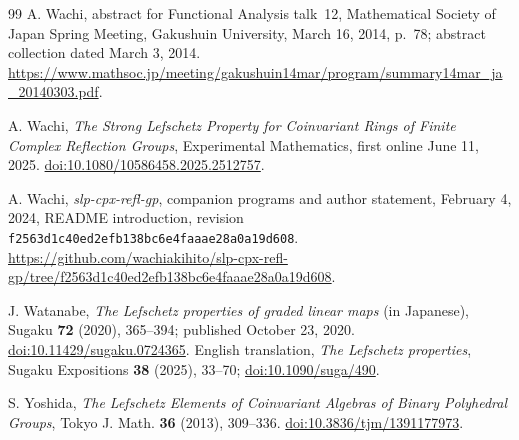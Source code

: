\documentclass[11pt]{article}
\theoremstyle{definition}
\begin{document}
\begin{thebibliography}{99}
A. Wachi, abstract for Functional Analysis talk~12, Mathematical Society of Japan
Spring Meeting, Gakushuin University, March 16, 2014, p.~78;
abstract collection dated March 3, 2014.
\url{https://www.mathsoc.jp/meeting/gakushuin14mar/program/summary14mar_ja_20140303.pdf}.

A. Wachi,
\emph{The Strong Lefschetz Property for Coinvariant Rings of Finite Complex Reflection Groups},
Experimental Mathematics, first online June 11, 2025.
\href{https://doi.org/10.1080/10586458.2025.2512757}{doi:10.1080/10586458.2025.2512757}.

A. Wachi, \emph{slp-cpx-refl-gp}, companion programs and author
statement, February 4, 2024, README introduction, revision
\texttt{f2563d1c40ed2efb138bc6e4faaae28a0a19d608}.
\url{https://github.com/wachiakihito/slp-cpx-refl-gp/tree/f2563d1c40ed2efb138bc6e4faaae28a0a19d608}.

J. Watanabe, \emph{The Lefschetz properties of graded linear maps}
(in Japanese), Sugaku \textbf{72} (2020), 365--394;
published October 23, 2020.
\href{https://doi.org/10.11429/sugaku.0724365}{doi:10.11429/sugaku.0724365}.
English translation, \emph{The Lefschetz properties},
Sugaku Expositions \textbf{38} (2025), 33--70;
\href{https://doi.org/10.1090/suga/490}{doi:10.1090/suga/490}.

S. Yoshida,
\emph{The Lefschetz Elements of Coinvariant Algebras of Binary Polyhedral Groups},
Tokyo J. Math. \textbf{36} (2013), 309--336.
\href{https://doi.org/10.3836/tjm/1391177973}{doi:10.3836/tjm/1391177973}.
\end{thebibliography}
\end{document}
